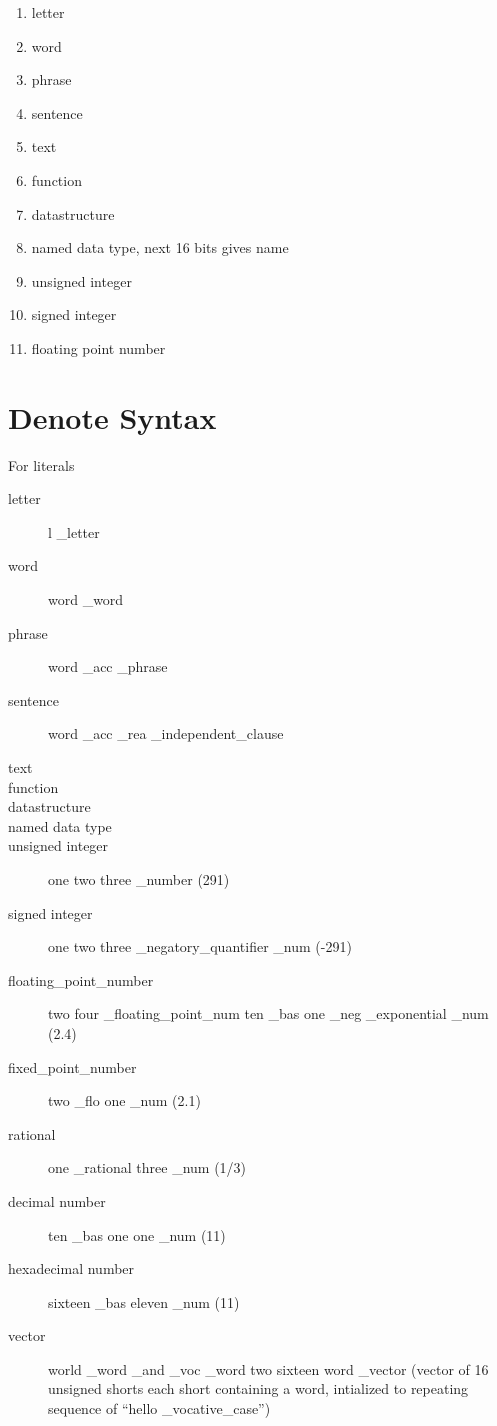 \documentclass[12pt]{report}
\begin{document}
\begin{enumerate}
  \setcounter{enumi}{0}
  \item letter
  \item word
  \item phrase
  \item sentence
  \item text
  \item function
  \item datastructure
  \item named data type, next 16 bits gives name
  \item unsigned integer
  \item signed integer
  \item floating point number
\end{enumerate}
\section{Denote Syntax}
For literals
\begin{description}
  \item[letter] l \_letter
  \item[word] word \_word
  \item[phrase] word \_acc \_phrase
  \item[sentence] word \_acc \_rea \_independent\_clause
  \item[text] 
  \item[function]
  \item[datastructure]
  \item[named data type]
  \item[unsigned integer] one two three \_number (291)
  \item[signed integer] one two three \_negatory\_quantifier \_num
(-291)
  \item[floating\_point\_number] two four \_floating\_point\_num ten \_bas
one \_neg \_exponential \_num (2.4)
  \item[fixed\_point\_number] two \_flo one \_num (2.1)
  \item[rational] one \_rational three \_num (1/3)
  \item[decimal number] ten \_bas  one one \_num (11)
  \item[hexadecimal number] sixteen \_bas eleven \_num (11)
  \item[vector] world \_word \_and \_voc \_word two sixteen word \_vector (vector of 16
unsigned shorts each short containing a word, intialized to repeating sequence
of ``hello \_vocative\_case'')
\end{description}
\end{document}
